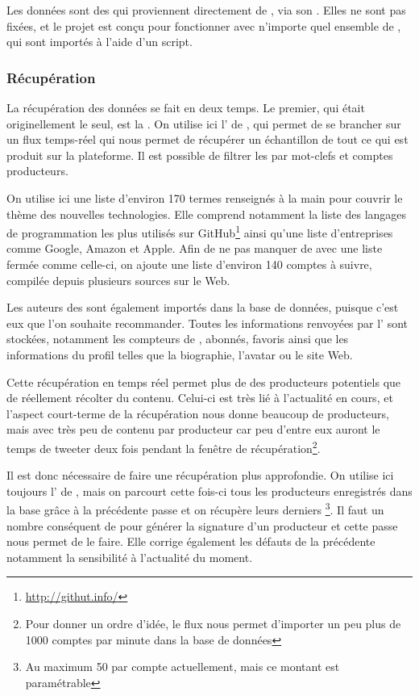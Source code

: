 Les données sont des \tweets{} qui proviennent directement de \twt{}, via son
\api{}. Elles ne sont pas fixées, et le projet est conçu pour fonctionner avec
n’importe quel ensemble de \tweets{}, qui sont importés à l’aide d’un script.

\subsubsection{Récupération}

La récupération des données se fait en deux temps. Le premier, qui était
originellement le seul, est la . On utilise ici l’\api{}
 de \twt{}, qui permet de se brancher sur un flux temps-réel qui
nous permet de récupérer un échantillon de tout ce qui est produit sur la
plateforme. Il est possible de filtrer les \tweets{} par mot-clefs et comptes
producteurs.

On utilise ici une liste d’environ 170 termes renseignés à la main pour couvrir
le thème des nouvelles technologies. Elle comprend notamment la liste des
langages de programmation les plus utilisés sur
GitHub\footnote{\url{http://githut.info/}} ainsi qu’une liste d’entreprises
comme Google, Amazon et Apple. Afin de ne pas manquer de \tweets{} avec une
liste fermée comme celle-ci, on ajoute une liste d’environ 140 comptes à
suivre, compilée depuis plusieurs sources sur le Web.

Les auteurs des \tweets{} sont également importés dans la base de données,
puisque c’est eux que l’on souhaite recommander. Toutes les informations
renvoyées par l’\api{} sont stockées, notamment les compteurs de \tweets{},
abonnés, favoris ainsi que les informations du profil telles que la biographie,
l’avatar ou le site Web.

Cette récupération en temps réel permet plus de  des producteurs
potentiels que de réellement récolter du contenu. Celui-ci est très lié à
l’actualité en cours, et l’aspect court-terme de la récupération nous donne
beaucoup de producteurs, mais avec très peu de contenu par producteur car peu
d’entre eux auront le temps de tweeter deux fois pendant la fenêtre de
récupération\footnote{Pour donner un ordre d’idée, le flux nous permet
d’importer un peu plus de 1000 comptes par minute dans la base de données}.

Il est donc nécessaire de faire une récupération plus approfondie. On utilise
ici toujours l’\api{} de \twt{}, mais on parcourt cette fois-ci tous les
producteurs enregistrés dans la base grâce à la précédente passe et on récupère
leurs derniers \tweets{}\footnote{Au maximum 50 par compte actuellement, mais
ce montant est paramétrable}. Il
faut un nombre conséquent de \tweets{} pour générer la signature d’un
producteur et cette passe nous permet de le faire. Elle corrige également les
défauts de la précédente notamment la sensibilité à l’actualité du moment.

